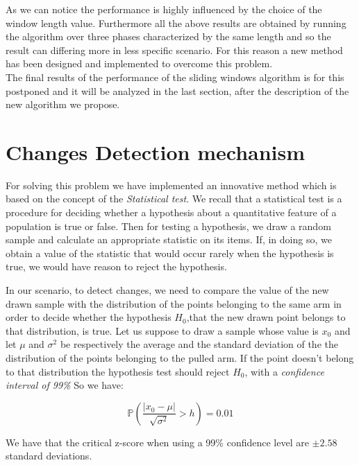 As we can notice the performance is highly influenced by the choice of the window length value.
Furthermore all the above results are obtained by running the algorithm over three phases characterized by the same length and so the result can differing more in less specific scenario. For this reason a new method has been designed and implemented to overcome this problem.\\
The final results of the performance of the sliding windows algorithm is for this postponed and it will be analyzed in the last section, after the description of the new algorithm we propose.


\section{Changes Detection mechanism}

For solving this problem we have implemented an innovative method which is based on the concept of the \textit{Statistical test}.
We recall that a statistical test is a procedure for deciding whether a hypothesis about a quantitative feature of a population is true or false. Then for testing a hypothesis, we draw a random sample and calculate an appropriate statistic on its items. If, in doing so, we obtain a value of the statistic that would occur rarely when the hypothesis is true, we would have reason to reject the hypothesis.

In our scenario, to detect changes, we need to compare the value of the new drawn sample with the distribution of the points belonging to the same arm in order to decide whether the hypothesis $H_0$,that the new drawn point belongs to that distribution, is true.
Let us suppose to draw a sample whose value is $x_0$ and let $\mu$ and $\sigma^2$ be respectively the average
and the standard deviation of the the distribution of the points belonging to the pulled arm. 
If the point doesn't belong to that distribution the hypothesis test should reject $H_0$, with a \textit{confidence interval of 99\%} So we have:

\begin{equation}
	 \mathbb{P}\left(\frac{|x_0 - \mu|}{\sqrt{\sigma^2}} > h \right) = 0.01
\end{equation}

We have that the critical z-score when using a 99\% confidence level are $\pm 2.58$ standard deviations.\\

